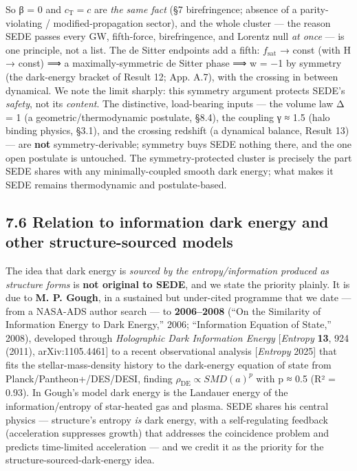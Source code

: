 \documentclass[
  10pt,
]{article}
\begin{document}
So β = 0 and \(c_{\mathrm{T}} = c\) are \emph{the same fact} (§7
birefringence; absence of a parity-violating / modified-propagation
sector), and the whole cluster --- the reason SEDE passes every GW,
fifth-force, birefringence, and Lorentz null \emph{at once} --- is one
principle, not a list. The de Sitter endpoints add a fifth:
\(f_{\mathrm{sat}}\) → const (with H → const) ⟹ a maximally-symmetric de
Sitter phase ⟹ w = −1 by symmetry (the dark-energy bracket of Result 12;
App. A.7), with the crossing in between dynamical. We note the limit
sharply: this symmetry argument protects SEDE's \emph{safety}, not its
\emph{content}. The distinctive, load-bearing inputs --- the volume law
Δ = 1 (a geometric/thermodynamic postulate, §8.4), the coupling γ ≈ 1.5
(halo binding physics, §3.1), and the crossing redshift (a dynamical
balance, Result 13) --- are \textbf{not} symmetry-derivable; symmetry
buys SEDE nothing there, and the one open postulate is untouched. The
symmetry-protected cluster is precisely the part SEDE shares with any
minimally-coupled smooth dark energy; what makes it SEDE remains
thermodynamic and postulate-based.

\subsection{7.6 Relation to information dark energy and other
structure-sourced
models}\label{relation-to-information-dark-energy-and-other-structure-sourced-models}

The idea that dark energy is \emph{sourced by the entropy/information
produced as structure forms} is \textbf{not original to SEDE}, and we
state the priority plainly. It is due to \textbf{M. P. Gough}, in a
sustained but under-cited programme that we date --- from a NASA-ADS
author search --- to \textbf{2006--2008} (``On the Similarity of
Information Energy to Dark Energy,'' 2006; ``Information Equation of
State,'' 2008), developed through \emph{Holographic Dark Information
Energy} {[}\emph{Entropy} \textbf{13}, 924 (2011), arXiv:1105.4461{]} to
a recent observational analysis {[}\emph{Entropy} 2025{]} that fits the
stellar-mass-density history to the dark-energy equation of state from
Planck/Pantheon+/DES/DESI, finding
\(\rho _{\mathrm{DE}} \propto  SMD(a)^{p}\) with p ≈ 0.5 (R² = 0.93). In
Gough's model dark energy is the Landauer energy of the
information/entropy of star-heated gas and plasma. SEDE shares his
central physics --- structure's entropy \emph{is} dark energy, with a
self-regulating feedback (acceleration suppresses growth) that addresses
the coincidence problem and predicts time-limited acceleration --- and
we credit it as the priority for the structure-sourced-dark-energy idea.
\end{document}

